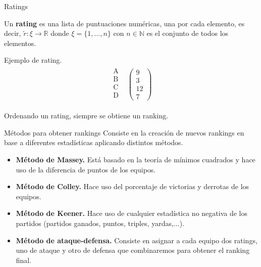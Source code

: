 \documentclass{beamer}
\begin{document}
	\begin{frame}{Ratings}
		\begin{defi} 
			Un \textbf{rating} es una lista de puntuaciones numéricas, una por cada elemento, es decir, $\tilde{r}: \xi \rightarrow \mathbb{R}$ donde $\xi = \{1,...,n\}$ con $n \in \mathbb{N}$ es el conjunto de todos los elementos.
		\end{defi}
		
		\begin{ejem}
			Ejemplo de rating.\\
			$$\begin{array}{ccc}
			\begin{array}{c}
			\text{A}\\
			\text{B} \\
			\text{C} \\
			\text{D} \\
			\end{array} & \left(\begin{array}{c}
			9\\
			3\\
			12\\
			7
			\end{array} \right)
			\end{array} $$ 	
		\end{ejem}	
		Ordenando un rating, siempre se obtiene un ranking.
	\end{frame}

	\begin{frame}{Métodos para obtener rankings}
		Consiste en la creación de nuevos rankings en base a diferentes estadísticas aplicando distintos métodos.
		\begin{itemize}
			\item \textbf{Método de Massey.} Está basado en la teoría de mínimos cuadrados y hace uso de la diferencia de puntos de los equipos.
			\item \textbf{Método de Colley.} Hace uso del porcentaje de victorias y derrotas de los equipos.
			\item \textbf{Método de Keener.} Hace uso de cualquier estadística no negativa de los partidos (partidos ganados, puntos, triples, yardas,...).
			\item \textbf{Método de ataque-defensa.} Consiste en asignar a cada equipo dos ratings, uno de ataque y otro de defensa que combinaremos para obtener el ranking final.
		\end{itemize}
	\end{frame}
\end{document}
